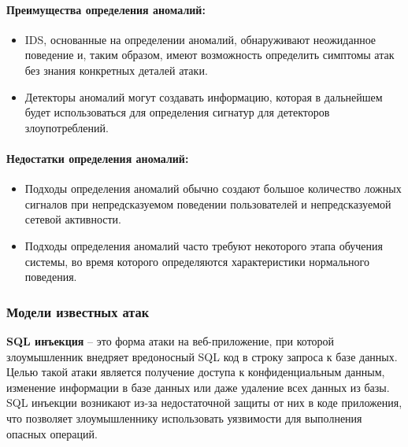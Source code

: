 \paragraph*{Преимущества определения аномалий:}

\begin{itemize}
	\item IDS, основанные на определении аномалий, обнаруживают неожиданное поведение и,
	таким образом, имеют возможность определить симптомы атак без знания конкретных деталей атаки.

	\item Детекторы аномалий могут создавать информацию, которая в дальнейшем будет
	использоваться для определения сигнатур для детекторов злоупотреблений.
\end{itemize}


\paragraph*{Недостатки определения аномалий:}

\begin{itemize}
	\item Подходы определения аномалий обычно создают большое количество ложных сигналов
	при непредсказуемом поведении пользователей и непредсказуемой сетевой активности.

	\item Подходы определения аномалий часто требуют некоторого этапа обучения системы,
	во время которого определяются характеристики нормального поведения.
\end{itemize}



\subsubsection{Модели известных атак}

\textbf{SQL инъекция} -- это форма атаки на веб-приложение, при которой злоумышленник внедряет вредоносный SQL код в строку запроса к базе данных. Целью такой атаки является получение доступа к конфиденциальным данным, изменение информации в базе данных или даже удаление всех данных из базы. SQL инъекции возникают из-за недостаточной защиты от них в коде приложения, что позволяет злоумышленнику использовать уязвимости для выполнения опасных операций.

